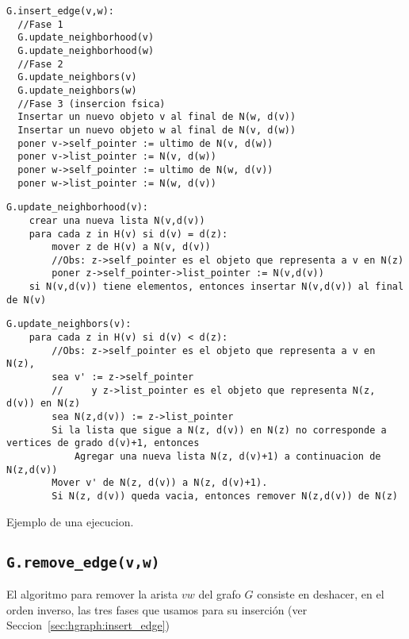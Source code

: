 \documentclass[%
    a4paper,%
    12pt,%
    twoside,%
    openright,%
    halfparskip,%
    cleardoubleempty,%
    bigheadings,%
    titlepage,%
    headsepline%
]{scrbook}
\begin{document}
\begin{lstlisting}
G.insert_edge(v,w):
  //Fase 1
  G.update_neighborhood(v)
  G.update_neighborhood(w)
  //Fase 2
  G.update_neighbors(v)
  G.update_neighbors(w)
  //Fase 3 (insercion fsica)
  Insertar un nuevo objeto v al final de N(w, d(v))
  Insertar un nuevo objeto w al final de N(v, d(w))
  poner v->self_pointer := ultimo de N(v, d(w))
  poner v->list_pointer := N(v, d(w))
  poner w->self_pointer := ultimo de N(w, d(v))
  poner w->list_pointer := N(w, d(v))
\end{lstlisting}

\begin{lstlisting}
G.update_neighborhood(v):
    crear una nueva lista N(v,d(v))
    para cada z in H(v) si d(v) = d(z):
        mover z de H(v) a N(v, d(v))
        //Obs: z->self_pointer es el objeto que representa a v en N(z)
        poner z->self_pointer->list_pointer := N(v,d(v))
    si N(v,d(v)) tiene elementos, entonces insertar N(v,d(v)) al final de N(v) 
\end{lstlisting}

\begin{lstlisting}
G.update_neighbors(v):
    para cada z in H(v) si d(v) < d(z):
        //Obs: z->self_pointer es el objeto que representa a v en N(z),
        sea v' := z->self_pointer
        //     y z->list_pointer es el objeto que representa N(z, d(v)) en N(z)
        sea N(z,d(v)) := z->list_pointer
        Si la lista que sigue a N(z, d(v)) en N(z) no corresponde a vertices de grado d(v)+1, entonces
            Agregar una nueva lista N(z, d(v)+1) a continuacion de N(z,d(v))
        Mover v' de N(z, d(v)) a N(z, d(v)+1).
        Si N(z, d(v)) queda vacia, entonces remover N(z,d(v)) de N(z)
\end{lstlisting}

Ejemplo de una ejecucion.

\subsection{\texttt{G.remove\_edge(v,w)}}
\label{sec:hgraph:remove_edge}

El algoritmo para remover la arista $vw$ del grafo $G$ consiste en deshacer, en el orden inverso, las tres fases que usamos para su inserción (ver Seccion~\ref{sec:hgraph:insert_edge})
\end{document}
